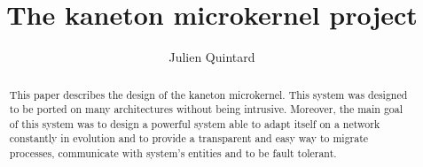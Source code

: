 
%
%



%
%


%
%

\title{The kaneton microkernel project}

%
%

\author{\small{Julien Quintard}}

%
%



%
%

\maketitle

%
%

\begin{abstract}

This paper describes the design of the kaneton microkernel.
This system was designed to be ported on many architectures without being
intrusive. Moreover, the main goal of this system was to design a powerful
system able to adapt itself on a network constantly in evolution and to
provide a transparent and easy way to migrate processes, communicate
with system's entities and to be fault tolerant.

\end{abstract}

%
%

